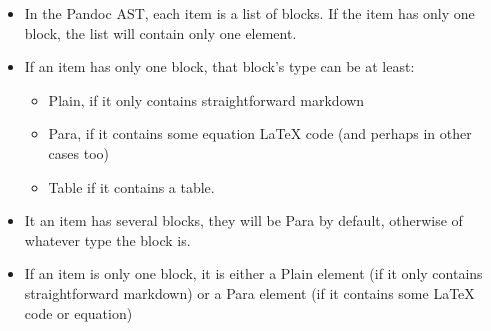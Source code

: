 \documentclass[
]{article}
\providecommand{\tightlist}{%
  \setlength{\itemsep}{0pt}\setlength{\parskip}{0pt}}
\begin{document}
\begin{itemize}
\tightlist
\item
  In the Pandoc AST, each item is a list of blocks. If the item has only
  one block, the list will contain only one element.
\item
  If an item has only one block, that block's type can be at least:

  \begin{itemize}
  \tightlist
  \item
    Plain, if it only contains straightforward markdown
  \item
    Para, if it contains some equation LaTeX code (and perhaps in other
    cases too)
  \item
    Table if it contains a table.
  \end{itemize}
\item
  It an item has several blocks, they will be Para by default, otherwise
  of whatever type the block is.
\item
  If an item is only one block, it is either a Plain element (if it only
  contains straightforward markdown) or a Para element (if it contains
  some LaTeX code or equation)
\end{itemize}
\end{document}
